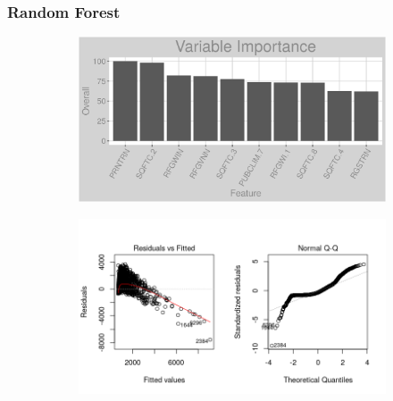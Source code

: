 \subsubsection{Random Forest}
\label{appendix:electricity:rf}
\begin{figure}[h]
\centering
\begin{subfigure}{1\textwidth}
\centering
\includegraphics[width=.99\textwidth, height=0.3\textheight]{Images/electricity_rf_vars.png}
\end{subfigure}
\begin{subfigure}{1\textwidth}
\centering
\includegraphics[width=.99\textwidth, height=0.475\textheight]{Images/electricity_rf_res_1.png}
\end{subfigure}
\end{figure}
\newpage
